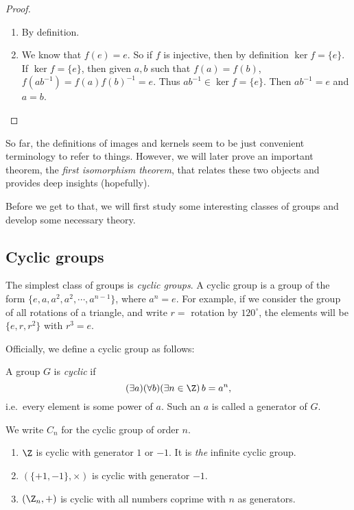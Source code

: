 \documentclass[a4paper]{article}
\begin{document}
\begin{proof}\leavevmode
  \begin{enumerate}
    \item By definition.
    \item We know that $f(e) = e$. So if $f$ is injective, then by definition $\ker f = \{e\}$. If $\ker f = \{e\}$, then given $a, b$ such that $f(a) = f(b)$, $f(ab^{-1}) = f(a)f(b)^{-1} = e$. Thus $ab^{-1}\in \ker f = \{e\}$. Then $ab^{-1} = e$ and $a = b$.
  \end{enumerate}
\end{proof}

So far, the definitions of images and kernels seem to be just convenient terminology to refer to things. However, we will later prove an important theorem, the \emph{first isomorphism theorem}, that relates these two objects and provides deep insights (hopefully).

Before we get to that, we will first study some interesting classes of groups and develop some necessary theory.

\subsection{Cyclic groups}
The simplest class of groups is \emph{cyclic groups}. A cyclic group is a group of the form $\{e, a, a^2, a^2, \cdots, a^{n - 1}\}$, where $a^n = e$. For example, if we consider the group of all rotations of a triangle, and write $r = $ rotation by $120^\circ$, the elements will be $\{e, r, r^2\}$ with $r^3 = e$.

Officially, we define a cyclic group as follows:
\begin{defi}
  A group $G$ is \emph{cyclic} if
  \[
    (\exists a)(\forall b)(\exists n\in\Z)\, b = a^n,
  \]
  i.e.\ every element is some power of $a$. Such an $a$ is called a generator of $G$.

  We write $C_n$ for the cyclic group of order $n$.
\end{defi}

\begin{eg}\leavevmode
  \begin{enumerate}
    \item $\Z$ is cyclic with generator $1$ or $-1$. It is \emph{the} infinite cyclic group.
    \item $(\{+1, -1\}, \times)$ is cyclic with generator $-1$.
    \item $(\Z_n, +)$ is cyclic with all numbers coprime with $n$ as generators.
  \end{enumerate}
\end{eg}
\end{document}
